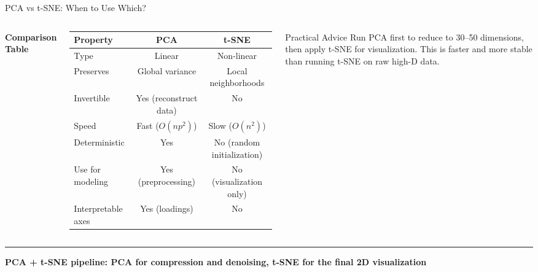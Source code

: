 \documentclass[8pt,aspectratio=169]{beamer}
\newcommand{\bottomnote}[1]{%
\vfill
\vspace{-2mm}
\textcolor{mllavender2}{\rule{\textwidth}{0.4pt}}
\vspace{1mm}
\footnotesize
\textbf{#1}
}
\begin{document}
\begin{frame}[t]{PCA vs t-SNE: When to Use Which?}
\begin{columns}[T]
\small
\textbf{Comparison Table}

\vspace{2mm}
\footnotesize
\begin{tabular}{@{}l c c@{}}
\toprule
\textbf{Property} & \textbf{\textcolor{dfteal}{PCA}} & \textbf{\textcolor{mlpurple}{t-SNE}} \\
\midrule
\rowcolor{mllavender4}
Type & Linear & Non-linear \\
Preserves & Global variance & Local neighborhoods \\
\rowcolor{mllavender4}
Invertible & Yes (reconstruct data) & No \\
Speed & Fast ($O(np^2)$) & Slow ($O(n^2)$) \\
\rowcolor{mllavender4}
Deterministic & Yes & No (random initialization) \\
Use for modeling & Yes (preprocessing) & No (visualization only) \\
\rowcolor{mllavender4}
Interpretable axes & Yes (loadings) & No \\
\bottomrule
\end{tabular}

\vspace{3mm}
\begin{block}{Practical Advice}
\scriptsize Run PCA first to reduce to 30--50 dimensions, then apply t-SNE for visualization. This is faster and more stable than running t-SNE on raw high-D data.
\end{block}
\end{columns}

\bottomnote{PCA + t-SNE pipeline: PCA for compression and denoising, t-SNE for the final 2D visualization}
\end{frame}
\end{document}
